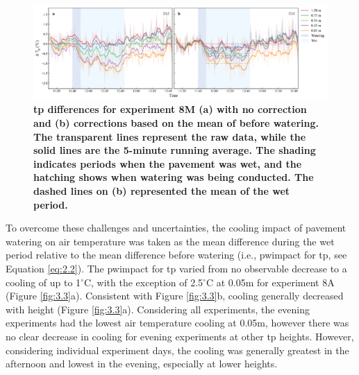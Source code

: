 \documentclass[final,3p,times,authoryear]{elsarticle}
\begin{document}
\begin{figure}
\centering
\includegraphics[trim={0 0 0 0},clip,scale=1.1]{pict013.png}
\caption{\bf \gls{tp} differences for experiment 8M (a) with no correction and (b) corrections based on the mean of before watering. The transparent lines represent the raw data, while the solid lines are the 5-minute running average. The shading indicates periods when the pavement was wet, and the hatching shows when watering was being conducted. The dashed lines on (b) represented the mean of the wet period.}
 \label{fig:3.2}
\end{figure}

To overcome these challenges and uncertainties, the cooling impact of pavement watering on air temperature was taken as the mean difference during the wet period relative to the mean difference before watering (i.e., \gls{pwimpact} for \gls{tp}, see Equation \ref{eq:2.2}). The \gls{pwimpact} for \gls{tp} varied from no observable decrease to a cooling of up to 1$^{\circ}$C, with the exception of 2.5$^{\circ}$C at 0.05m for experiment 8A (Figure \ref{fig:3.3}a). Consistent with Figure \ref{fig:3.3}b, cooling generally decreased with height (Figure \ref{fig:3.3}a). Considering all experiments, the evening experiments had the lowest air temperature cooling at 0.05m, however there was no clear decrease in cooling for evening experiments at other \gls{tp} heights. However, considering individual experiment days, the cooling was generally greatest in the afternoon and lowest in the evening, especially at lower heights.
\end{document}
